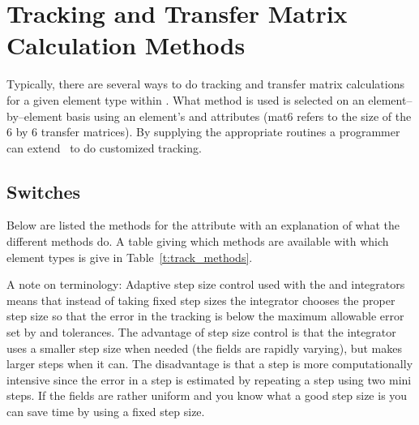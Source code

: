 \chapter{Tracking and Transfer Matrix Calculation Methods}

Typically, there are several ways to do tracking and transfer matrix
calculations for a given element type within \bmad. What method is used
is selected on an element--by--element basis using
an element's  and  attributes 
(mat6 refers to the size of the 6 by 6 transfer matrices). By supplying
the appropriate routines a programmer can extend \bmad\ to do customized 
tracking.

\section{ Switches}
\label{s:tkm}

Below are listed the methods for the 
attribute with an explanation of what the different methods do. A
table giving which methods are available with which element types is give
in Table~\ref{t:track_methods}. 

A note on terminology: Adaptive step size control used with the
 and  integrators means that 
instead of taking fixed step sizes the integrator chooses the proper
step size so that the error in the tracking is below the maximum
allowable error set by  and  tolerances. The
advantage of step size control is that the integrator uses a smaller
step size when needed (the fields are rapidly varying), but makes
larger steps when it can. The disadvantage is that a step is more
computationally intensive since the error in a step is estimated by
repeating a step using two mini steps. If the fields are rather
uniform and you know what a good step size is you can save time by using
a fixed step size.

